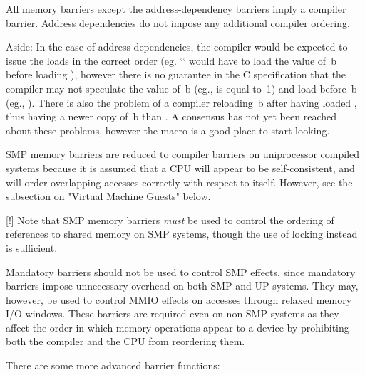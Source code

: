 All memory barriers except the address-dependency barriers imply a compiler
barrier.
Address dependencies do not impose any additional compiler ordering.

Aside:
In the case of address dependencies, the compiler would be expected
to issue the loads in the correct order (eg. `` would have to load
the value of~b before loading ), however there is no guarantee in
the C specification that the compiler may not speculate the value of~b
(eg., is equal to~1) and load  before~b (eg.,
).
There is also the problem of a compiler reloading~b after having loaded
, thus having a newer copy of~b than .
A consensus has not yet been reached about these problems, however the
 macro is a good place to start looking.

SMP memory barriers are reduced to compiler barriers on uniprocessor compiled
systems because it is assumed that a CPU will appear to be self-consistent,
and will order overlapping accesses correctly with respect to itself.
However, see the subsection on "Virtual Machine Guests" below.

[!] Note that SMP memory barriers \emph{must} be used to control the ordering of
references to shared memory on SMP systems, though the use of locking instead
is sufficient.

Mandatory barriers should not be used to control SMP effects, since mandatory
barriers impose unnecessary overhead on both SMP and UP systems.
They may, however, be used to control MMIO effects on accesses through
relaxed memory I/O windows.
These barriers are required even on non-SMP systems as they affect the order
in which memory operations appear to a device by prohibiting both the
compiler and the CPU from reordering them.


There are some more advanced barrier functions:

